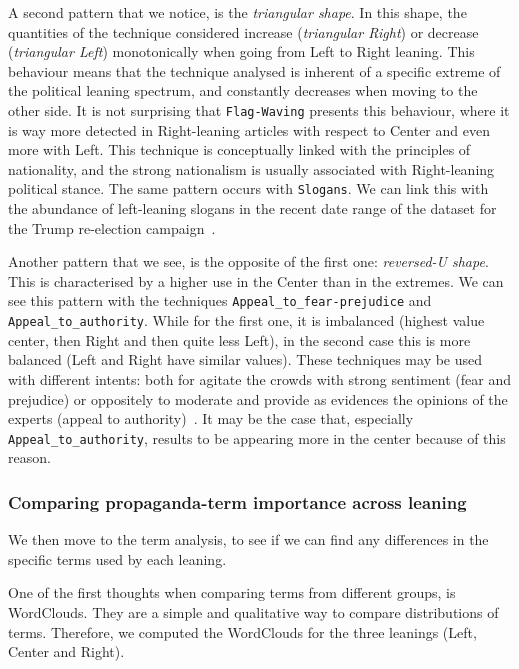 A second pattern that we notice, is the \emph{triangular shape}. In this shape, the quantities of the technique considered increase (\emph{triangular Right}) or decrease (\emph{triangular Left}) monotonically when going from Left to Right leaning.
This behaviour means that the technique analysed is inherent of a specific extreme of the political leaning spectrum, and constantly decreases when moving to the other side.
It is not surprising that \texttt{Flag-Waving} presents this behaviour, where it is way more detected in Right-leaning articles with respect to Center and even more with Left. This technique is conceptually linked with the principles of nationality, and the strong nationalism is usually associated with Right-leaning political stance.
The same pattern occurs with \texttt{Slogans}. We can link this with the abundance of left-leaning slogans in the recent date range of the dataset for the Trump re-election campaign~\citep{jiang2020political}.

Another pattern that we see, is the opposite of the first one: \emph{reversed-U shape}. This is characterised by a higher use in the Center than in the extremes.
We can see this pattern with the techniques \texttt{Appeal\_to\_fear-prejudice} and \texttt{Appeal\_to\_authority}. While for the first one, it is imbalanced (highest value center, then Right and then quite less Left), in the second case this is more balanced (Left and Right have similar values).
These techniques may be used with different intents: both for agitate the crowds with strong sentiment (fear and prejudice) or oppositely to moderate and provide as evidences the opinions of the experts (appeal to authority)~\citep{walton2010appeal}. It may be the case that, especially \texttt{Appeal\_to\_authority}, results to be appearing more in the center because of this reason.

\subsubsection{Comparing propaganda-term importance across leaning}
We then move to the term analysis, to see if we can find any differences in the specific terms used by each leaning.

One of the first thoughts when comparing terms from different groups, is WordClouds.
They are a simple and qualitative way to compare distributions of terms.
Therefore, we computed the WordClouds for the three leanings (Left, Center and Right).


